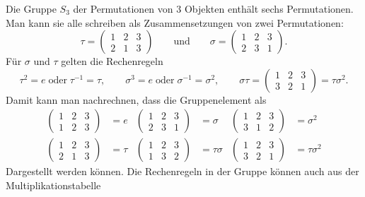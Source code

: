 Die Gruppe $S_3$ der Permutationen von $3$ Objekten enthält sechs
Permutationen.
Man kann sie alle schreiben als Zusammensetzungen von zwei Permutationen:
\[
\tau = \begin{pmatrix}1&2&3\\2&1&3\end{pmatrix}
\qquad\text{und}\qquad
\sigma = \begin{pmatrix}1&2&3\\2&3&1\end{pmatrix}.
\]
Für $\sigma$ und $\tau$ gelten die Rechenregeln
\[
\tau^2=e\;\text{oder}\;\tau^{-1}=\tau,
\qquad
\sigma^3=e\;\text{oder}\;\sigma^{-1}=\sigma^2,
\qquad
\sigma\tau
=
\begin{pmatrix}1&2&3\\3&2&1\end{pmatrix}
=
\tau\sigma^2.
\]
Damit kann man nachrechnen, dass die Gruppenelement als
\begin{align*}
\begin{pmatrix} 1&2&3\\1&2&3 \end{pmatrix} &= e &
\begin{pmatrix} 1&2&3\\2&3&1 \end{pmatrix} &= \sigma &
\begin{pmatrix} 1&2&3\\3&1&2 \end{pmatrix} &= \sigma^2 \\
\begin{pmatrix} 1&2&3\\2&1&3 \end{pmatrix} &= \tau &
\begin{pmatrix} 1&2&3\\1&3&2 \end{pmatrix} &= \tau\sigma &
\begin{pmatrix} 1&2&3\\3&2&1 \end{pmatrix} &= \tau\sigma^2
\end{align*}
Dargestellt werden können.
Die Rechenregeln in der Gruppe können auch aus der Multiplikationstabelle
